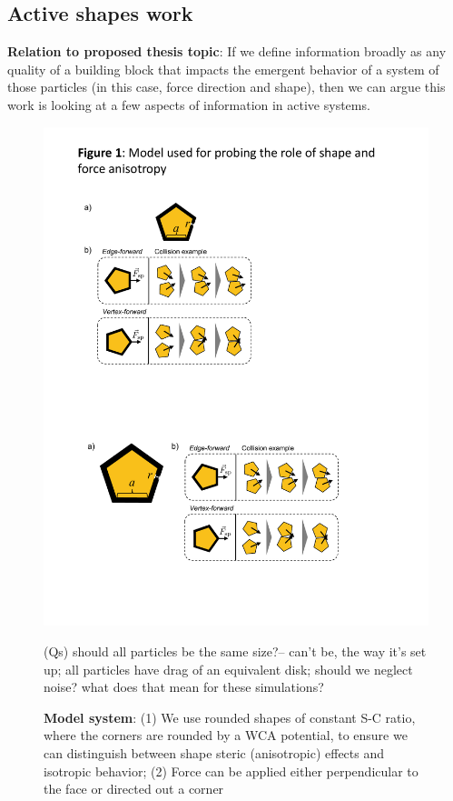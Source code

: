\subsection{Active shapes work}

\textbf{Relation to proposed thesis topic}: If we define information broadly as any quality of a building block that impacts the emergent behavior of a system of those particles (in this case, force direction and shape), then we can argue this work is looking at a few aspects of information in active systems.


\begin{figure}[t]
\begin{center}
\includegraphics[width=5in]{../figures/Fig1.pdf}
\caption{\textbf{Model system}: (1) We use rounded shapes of constant S-C ratio, where the corners are rounded by a WCA potential, to ensure we can distinguish between shape steric (anisotropic) effects and isotropic behavior; (2) Force can be applied either perpendicular to the face or directed out a corner}
(Qs) should all particles be the same size?-- can't be, the way it's set up; all particles have drag of an equivalent disk; should we neglect noise? what does that mean for these simulations?
\label{fig:model}
\end{center}
\end{figure}

